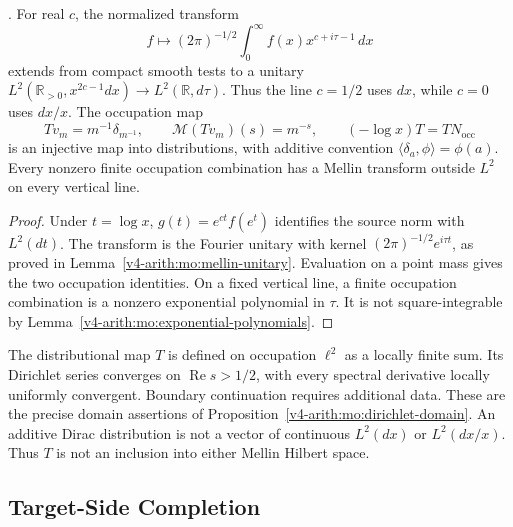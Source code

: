 \begin{lemma}
\label{v4-arith:w9-r4:lem:no-mellin-on-HBC}
\ClaimStatusProvedHere. For real $c$, the normalized transform
\[
 f\longmapsto (2\pi)^{-1/2}\int_0^\infty f(x)x^{c+i\tau-1}\,dx
\]
extends from compact smooth tests to a unitary
$L^2(\mathbb R_{>0},x^{2c-1}dx)\to L^2(\mathbb R,d\tau)$.
Thus the line $c=1/2$ uses $dx$, while $c=0$ uses $dx/x$.
The occupation map
\[
 Tv_m=m^{-1}\delta_{m^{-1}},\qquad
 \mathcal M(Tv_m)(s)=m^{-s},\qquad
 (-\log x)T=TN_{\mathrm{occ}}
\]
is an injective map into distributions, with additive convention
$\langle\delta_a,\phi\rangle=\phi(a)$.
Every nonzero finite occupation combination has a Mellin transform
outside $L^2$ on every vertical line.
\end{lemma}
\begin{proof}
Under $t=\log x$, $g(t)=e^{ct}f(e^t)$ identifies the source
norm with $L^2(dt)$. The transform is the Fourier unitary with
kernel $(2\pi)^{-1/2}e^{i\tau t}$, as proved in
Lemma~\ref{v4-arith:mo:mellin-unitary}. Evaluation on a point mass
gives the two occupation identities. On a fixed vertical line,
a finite occupation combination is a nonzero exponential polynomial
in $\tau$. It is not square-integrable by
Lemma~\ref{v4-arith:mo:exponential-polynomials}.
\end{proof}

\begin{remark}
\label{v4-arith:w9-r4:rem:lattice-ill-suited}
The distributional map $T$ is defined on occupation $\ell^2$ as
a locally finite sum. Its Dirichlet series converges on
$\operatorname{Re}s>1/2$, with every spectral derivative locally
uniformly convergent. Boundary continuation requires additional
data. These are the precise domain assertions of
Proposition~\ref{v4-arith:mo:dirichlet-domain}.
An additive Dirac distribution is not a vector of continuous
$L^2(dx)$ or $L^2(dx/x)$. Thus $T$ is not an inclusion into
either Mellin Hilbert space.
\end{remark}

\subsection{Target-Side Completion}
\label{v4-arith:w9-r4:obstacle-hilbert:target}


